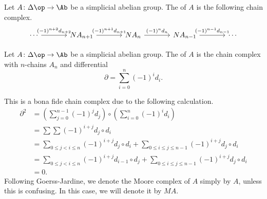 \documentclass[main.tex]{subfiles}
\begin{document}
\begin{definition}
  \label{def:normalized_chain_complex}
  Let $A\colon \Delta\op \to \Ab$ be a simplicial abelian group. The  of $A$ is the following chain complex.
  \begin{equation*}
    \begin{tikzcd}[column sep=large]
      \cdots
      \arrow[r, "(-1)^{n+2}d_{n+2}"]
      & N A_{n+1}
      \arrow[r, "(-1)^{n+1}d_{n+1}"]
      & N A_{n}
      \arrow[r, "(-1)^{n}d_{n}"]
      & N A_{n-1}
      \arrow[r, "(-1)^{n-1}d_{n-1}"]
      & \cdots
    \end{tikzcd}
  \end{equation*}
\end{definition}

\begin{definition}
  \label{def:moore_complex}
  Let $A\colon \Delta\op \to \Ab$ be a simplicial abelian group. The  of $A$ is the chain complex with $n$-chains $A_{n}$ and differential
  \begin{equation*}
    \partial = \sum_{i = 0}^{n} (-1)^{i} d_{i}.
  \end{equation*}
\end{definition}

This is a bona fide chain complex due to the following calculation.
\begin{align*}
  \partial^{2} &= \left( \sum_{j = 0}^{n-1}(-1)^{j}d_{j} \right) \circ \left( \sum_{i = 0}^{n}(-1)^{i}d_{i} \right) \\
  &= \sum\sum (-1)^{i+j} d_{j} \circ d_{i} \\
  &= \sum_{0 \leq j < i \leq n} (-1)^{i+j} d_{j} \circ d_{i} + \sum_{0 \leq i \leq j \leq n-1} (-1)^{i+j} d_{j} \circ d_{i} \\
  &= \sum_{0 \leq j < i \leq n} (-1)^{i+j} d_{i-1} \circ d_{j} + \sum_{0 \leq i \leq j \leq n-1} (-1)^{i+j} d_{j} \circ d_{i} \\
  &= 0.
\end{align*}
Following Goerss-Jardine, we denote the Moore complex of $A$ simply by $A$, unless this is confusing. In this case, we will denote it by $M A$.
\end{document}
